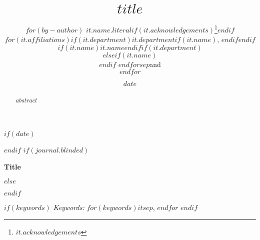 

\def\spacingset#1{\renewcommand{\baselinestretch}%
{#1}\small\normalsize} \spacingset{1}



$if(date)$
\date{$date$}
$endif$
$if(journal.blinded)$
\spacingset{.8}
\bigskip
\bigskip
\bigskip
\begin{center}
  {\LARGE\bf Title}
\end{center}
\smallskip
\bigskip
\spacingset{1}
$else$
\title{\bf $title$}
\author{
$for(by-author)$
$it.name.literal$$if(it.acknowledgements)$\thanks{$it.acknowledgements$}$endif$\\
$for(it.affiliations)$$if(it.department)$$it.department$$if(it.name)$, $endif$$endif$$if(it.name)$$it.name$$endif$$if(it.department)$\\$elseif(it.name)$\\$endif$
$endfor$$sep$and\\$endfor$}
\maketitle
$endif$

\bigskip
\bigskip
\begin{abstract}
$abstract$
\end{abstract}

$if(keywords)$
\noindent%
{\it Keywords:} $for(keywords)$$it$$sep$, $endfor$
\vfill
$endif$

\newpage
\spacingset{1.9} %

